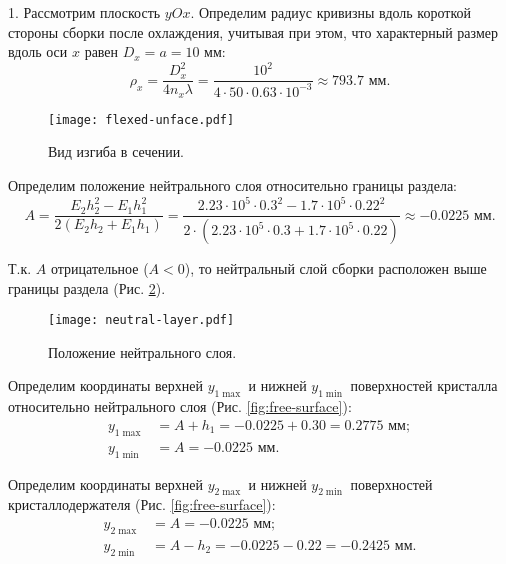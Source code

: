 1. Рассмотрим плоскость $yOx$. Определим радиус кривизны вдоль короткой стороны сборки после охлаждения, учитывая при этом, что характерный размер вдоль оси $x$ равен $D_x = a = 10 \text{ мм}$:
\[
    \rho_x = \frac{D_x^2}{4 n_x \lambda} = \frac{10^2}{4 \cdot 50 \cdot 0.63 \cdot 10^{-3}} \approx 793.7 \text{ мм}.
\]

\begin{figure}[h]
    \centering
    \texttt{[image: flexed-unface.pdf]}
    \caption{Вид изгиба в сечении.}
    \label{fig:flexed-unface}
\end{figure}

Определим положение нейтрального слоя относительно границы раздела:
\[
    A = \frac{E_2 h_2^2 - E_1 h_1^2}{2 \left(E_2 h_2 + E_1 h_1\right)}
      = \frac{2.23 \cdot 10^5 \cdot 0.3^2 - 1.7 \cdot 10^5 \cdot 0.22^2}{2 \cdot (2.23 \cdot 10^5 \cdot 0.3 + 1.7 \cdot 10^5 \cdot 0.22)}
      \approx -0.0225 \text{ мм}.
\]

Т.к. $A$ отрицательное ($A < 0$), то нейтральный слой сборки расположен выше границы раздела (Рис. \ref{fig:neutral-layer}).

\begin{figure}[h]
    \centering
    \texttt{[image: neutral-layer.pdf]}
    \caption{Положение нейтрального слоя.}
    \label{fig:neutral-layer}
\end{figure}

Определим координаты верхней $y_{1\max}$ и нижней $y_{1\min}$ поверхностей кристалла относительно нейтрального слоя (Рис. \ref{fig:free-surface}):
\begin{equation}
    \begin{aligned}
        y_{1\max} & = A + h_1 = -0.0225 + 0.30 = 0.2775 \text{ мм}; \\
        y_{1\min} & = A = -0.0225 \text{ мм}.
    \end{aligned}
\end{equation}

Определим координаты верхней $y_{2\max}$ и нижней $y_{2\min}$ поверхностей кристаллодержателя (Рис. \ref{fig:free-surface}):
\begin{equation}
    \begin{aligned}
        y_{2\max} & = A = -0.0225 \text{ мм}; \\
        y_{2\min} & = A - h_2 = -0.0225 - 0.22 = -0.2425 \text{ мм}.
    \end{aligned}
\end{equation}

